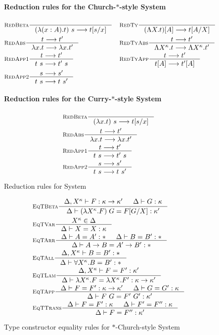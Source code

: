 \begin{figure}
\paragraph{Reduction rules for the Church-$*$-style System \Fw}
\begin{align*}
& \inference[\sc RedBeta]{}{(\l(x:A).t)~s --> t[s/x]}
&&\inference[\sc RedTy]{}{(\L X   .t)[A] --> t[A/X]} \\
& \inference[\sc RedAbs]{t --> t'}{\l x   .t --> \l x   .t'}
&&\inference[\sc RedTyAbs]{t --> t'}{\L X^\kappa   .t --> \L X^\kappa   .t'} \\
& \inference[\sc RedApp1]{t --> t'}{t~s --> t'~s}
&&\inference[\sc RedTyApp]{t --> t'}{t[A] --> t'[A]} \\
& \inference[\sc RedApp2]{s --> s'}{t~s --> t~s'}
\end{align*}
\paragraph{Reduction rules for the Curry-$*$-style System \Fw}
\begin{align*}
& \inference[\sc RedBeta]{}{(\l x   .t)~s --> t[s/x]} \\
& \inference[\sc RedAbs]{t --> t'}{\l x   .t --> \l x   .t'} \\
& \inference[\sc RedApp1]{t --> t'}{t~s --> t'~s} \\
& \inference[\sc RedApp2]{s --> s'}{t~s --> t~s'}
\end{align*}
\caption{Reduction rules for System \Fw}
\label{fig:redfw}
\end{figure}

\begin{figure}
\begin{align*}
& \inference[\sc EqTBeta]
        {\Delta,X^\kappa |- F : \kappa -> \kappa' & \Delta |- G : \kappa}
        {\Delta |- (\l X^\kappa.F)\;G = F[G/X] : \kappa'} \\
& \inference[\sc EqTVar]{X^\kappa \in \Delta}{\Delta |- X = X : \kappa} \\
& \inference[\sc EqTArr]{\Delta |- A=A':* & \Delta |- B=B':*}
                        {\Delta |- A -> B=A' -> B':*} \\
& \inference[\sc EqTAll]{\Delta,X^\kappa |- B=B':*}
                        {\Delta |- \forall X^\kappa.B=B':*} \\
& \inference[\sc EqTLam]
        {\Delta,X^\kappa |- F=F':\kappa'}
        {\Delta |- \l X^\kappa.F=\l X^\kappa.F':\kappa -> \kappa'} \\
& \inference[\sc EqTApp]
        {\Delta |- F=F' : \kappa -> \kappa' & \Delta |- G=G' : \kappa}
        {\Delta |- F ~ G = F' ~ G' : \kappa'} \\
& \inference[\sc EqTTrans]
        {\Delta |- F=F' : \kappa & \Delta |- F'=F'' : \kappa}
        {\Delta |- F=F'' : \kappa'}
\end{align*}
\caption{Type constructor equality rules for $*$-Church-style System \Fw}
\label{fig:eqtyfw}
\end{figure}

